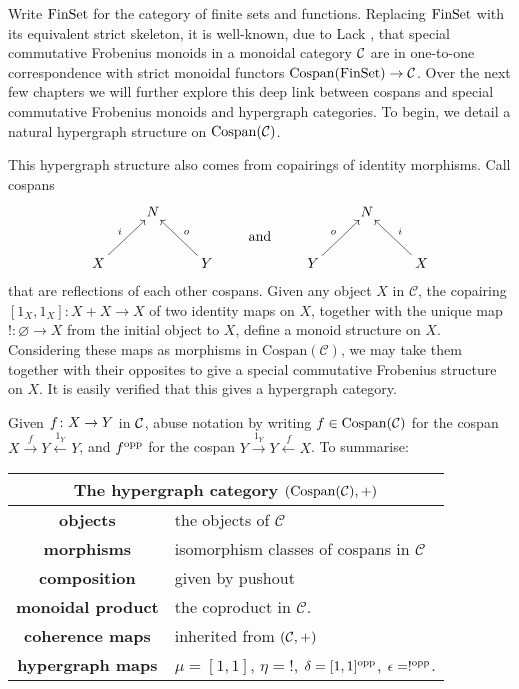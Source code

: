 Write $\mathrm{FinSet}$ for the category of finite sets and functions. Replacing
$\mathrm{FinSet}$ with its equivalent strict skeleton, it is well-known, due to Lack
\cite{Lac04}, that special commutative Frobenius monoids in a monoidal category
$\mathcal C$ are in one-to-one correspondence with strict monoidal functors
$\operatorname{{Cospan}}(\mathrm{FinSet}) \to \mathcal C$. Over the next few chapters we will further explore
this deep link between cospans and special commutative Frobenius monoids and
hypergraph categories. To begin, we detail a natural hypergraph structure on
$\operatorname{{Cospan}}(\mathcal C)$. 

This hypergraph structure also comes from copairings of identity morphisms.
Call cospans 
\[
  \xymatrix{
    & N \\
    X \ar[ur]^{i} && Y \ar[ul]_{o}
  }
  \qquad \xymatrix@R=8pt{\\\textrm{and}} \qquad 
  \xymatrix{
    & N \\
    Y \ar[ur]^{o} && X \ar[ul]_{i}
  }
\]
that are reflections of each other  cospans. Given any object
$X$ in $\mathcal C$, the copairing $[1_X,1_X]\colon  X + X \to X$ of two identity
maps on $X$, together with the unique map $!\colon  \varnothing \to X$ from the
initial object to $X$, define a monoid structure on $X$. Considering these
maps as morphisms in $\mathrm{Cospan(\mathcal C)}$, we may take them together
with their opposites to give a special commutative Frobenius structure on $X$.
It is easily verified that this gives a hypergraph category.

Given $f {\colon} X \to Y$ in $\mathcal C$, abuse notation by writing $f \in
\mathrm{Cospan}(\mathcal C)$ for the cospan $X \stackrel{f}\to Y
\stackrel{1_Y}\leftarrow Y$, and $f^{\mathrm{opp}}$ for the cospan $Y \stackrel{1_Y}\to Y
\stackrel{f}\leftarrow X$. To summarise:
  \begin{center}
  \begin{tabular}{ |c| p{}|}
      \hline
      \multicolumn{2}{|c|}{The hypergraph category $(\mathrm{Cospan(\mathcal C)},+)$} \\
    \hline
    \textbf{objects} & the objects of $\mathcal C$ \\ 
    \textbf{morphisms} & isomorphism classes of cospans in
    $\mathcal C$\\ 
  \textbf{composition} & given by pushout \\
  \textbf{monoidal product} & the coproduct in $\mathcal C$. \\
  \textbf{coherence maps} & inherited from $(\mathcal C,+)$\\
  \textbf{hypergraph maps} & $\mu = [1,1]$, $\eta = !$,
  $\delta = [1,1]^{\mathrm{opp}}$, $\epsilon = !^{\mathrm{opp}}$. \\
      \hline
  \end{tabular}
\end{center}
   
